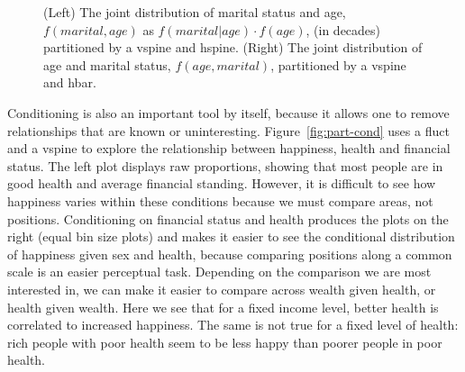 \documentclass[journal]{vgtc}
\begin{document}
\begin{figure}[htbp]
\begin{minipage}[t]{0.49\linewidth}
 \end{minipage}
  \caption{(Left) The joint distribution of marital status and age, $f(marital, age)$ as $f(marital|age) \cdot f(age)$, (in decades) partitioned by a vspine and hspine.  (Right) The joint distribution of age and marital status, $f(age, marital)$, partitioned by a vspine and hbar.}
  \label{fig:marital}
\end{figure}

Conditioning is also an important tool by itself, because it allows one to remove relationships that are known or uninteresting. Figure~\ref{fig:part-cond} uses a fluct and a vspine to explore the relationship between happiness, health and financial status. The left plot displays raw proportions, showing that most people are in good health and average financial standing. However, it is difficult to see how happiness varies within these conditions because we must compare areas, not positions. Conditioning on financial status and health produces the plots on the right (equal bin size plots) and makes it easier to see the conditional distribution of happiness given sex and health, because comparing positions along a common scale is an easier perceptual task. Depending on the comparison we are most interested in, we can make it easier to compare across wealth given health, or health given wealth. Here we see that for a fixed income level, better health is correlated to increased happiness. The same is not true for a fixed level of health: rich people with poor health seem to be less happy than poorer people in poor health.
\end{document}
